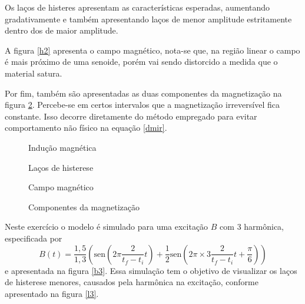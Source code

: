 \documentclass{homeworg}
\begin{document}
\hspace{1cm} Os laços de histeres apresentam as características esperadas, aumentando gradativamente e também apresentando laços de menor amplitude estritamente dentro dos de maior amplitude.

\hspace{1cm} A figura \ref{h2} apresenta o campo magnético, nota-se que, na região linear o campo é mais próximo de uma senoide, porém vai sendo distorcido a medida que o material satura.

\hspace{1cm} Por fim, também são apresentadas as duas componentes da magnetização na figura \ref{c2}. Percebe-se em certos intervalos que a magnetização irreversível fica constante. Isso decorre diretamente do método empregado para evitar comportamento não físico na equação \ref{dmir}.

\begin{figure}[!h]
  \begin{minipage}{.49\linewidth}
    \centering
    
    \vspace{-.5cm}
    \caption{Indução magnética}
    \label{b2}
  \end{minipage}%
  \begin{minipage}{.49\linewidth}
    \centering
    
    \vspace{-.5cm}
    \caption{Laços de histerese}
    \label{l2}
  \end{minipage}
\end{figure}
\begin{figure}[!h]
  \begin{minipage}{.49\linewidth}
    \centering
    
    \vspace{-.5cm}
    \caption{Campo magnético}
    \label{h2}
  \end{minipage}%
  \begin{minipage}{.49\linewidth}
    \centering
    
    \vspace{-.5cm}
    \caption{Componentes da magnetização}
    \label{c2}
  \end{minipage}%
\end{figure}

\exercise

\hspace{1cm} Neste exercício o modelo é simulado para uma excitação $B$ com {3\textordfeminine} harmônica, especificada por
\begin{equation}
  B(t) = \frac{1,5}{1,3} \left(\mathrm{sen}\left(2\pi \frac{2}{t_f-t_i} t\right) + \frac{1}{2} \mathrm{sen}\left(2\pi\times 3 \frac{2}{t_f-t_i} t + \frac{\pi}{6}\right)\right)
\end{equation}
e apresentada na figura \ref{b3}. Essa simulação tem o objetivo de visualizar os laços de histerese menores, causados pela harmônica na excitação, conforme apresentado na figura \ref{l3}.
\end{document}
